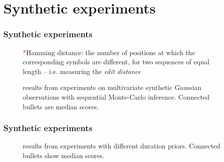 \documentclass[aspectratio=169]{beamer}
\begin{document}



\section{Synthetic experiments}
\begin{frame}
    \frametitle{Synthetic experiments}
    \begin{figure}[ht!]
        \hfill
        \hfill
        \hfill
        \caption{results from experiments on multivariate synthetic Gaussian observations with sequential Monte-Carlo inference. Connected bullets are median scores.}
        \textcolor{red}{*}\footnotesize{Hamming distance: the number of positions at which the corresponding symbols are different, for two sequences of equal length -- i.e. measuring the \emph{edit distance}}
    \end{figure}
\end{frame}

\begin{frame}
    \frametitle{Synthetic experiments}
    \begin{figure}[ht!]
        \hfill
        \hfill
        \hfill
        \caption{results from experiments with different duration priors. Connected bullets show median scores.}
    \end{figure}
\end{frame}
\end{document}
